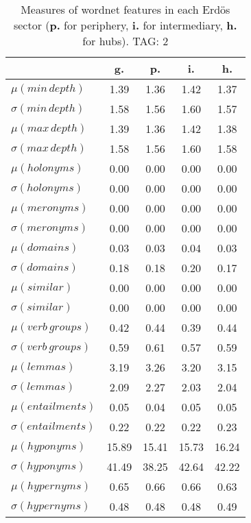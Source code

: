 \begin{table}[h!]
\begin{center}
\begin{tabular}{| l || c | c | c | c |}\hline
 & {\bf g.} & {\bf p.} & {\bf i.} & {\bf h.} \\\hline\hline
$\mu(min\,depth)$ & 1.39  & 1.36  & 1.42  & 1.37 \\
$\sigma(min\,depth)$ & 1.58  & 1.56  & 1.60  & 1.57 \\\hline
$\mu(max\,depth)$ & 1.39  & 1.36  & 1.42  & 1.38 \\
$\sigma(max\,depth)$ & 1.58  & 1.56  & 1.60  & 1.58 \\\hline
$\mu(holonyms)$ & 0.00  & 0.00  & 0.00  & 0.00 \\
$\sigma(holonyms)$ & 0.00  & 0.00  & 0.00  & 0.00 \\\hline
$\mu(meronyms)$ & 0.00  & 0.00  & 0.00  & 0.00 \\
$\sigma(meronyms)$ & 0.00  & 0.00  & 0.00  & 0.00 \\\hline
$\mu(domains)$ & 0.03  & 0.03  & 0.04  & 0.03 \\
$\sigma(domains)$ & 0.18  & 0.18  & 0.20  & 0.17 \\\hline
$\mu(similar)$ & 0.00  & 0.00  & 0.00  & 0.00 \\
$\sigma(similar)$ & 0.00  & 0.00  & 0.00  & 0.00 \\\hline
$\mu(verb\,groups)$ & 0.42  & 0.44  & 0.39  & 0.44 \\
$\sigma(verb\,groups)$ & 0.59  & 0.61  & 0.57  & 0.59 \\\hline
$\mu(lemmas)$ & 3.19  & 3.26  & 3.20  & 3.15 \\
$\sigma(lemmas)$ & 2.09  & 2.27  & 2.03  & 2.04 \\\hline
$\mu(entailments)$ & 0.05  & 0.04  & 0.05  & 0.05 \\
$\sigma(entailments)$ & 0.22  & 0.22  & 0.22  & 0.23 \\\hline
$\mu(hyponyms)$ & 15.89  & 15.41  & 15.73  & 16.24 \\
$\sigma(hyponyms)$ & 41.49  & 38.25  & 42.64  & 42.22 \\\hline
$\mu(hypernyms)$ & 0.65  & 0.66  & 0.66  & 0.63 \\
$\sigma(hypernyms)$ & 0.48  & 0.48  & 0.48  & 0.49 \\\hline
\end{tabular}
\caption{Measures of wordnet features in each Erd\"os sector ({{\bf p.}} for periphery, {{\bf i.}} for intermediary, {{\bf h.}} for hubs). TAG: 2}
\end{center}
\end{table}